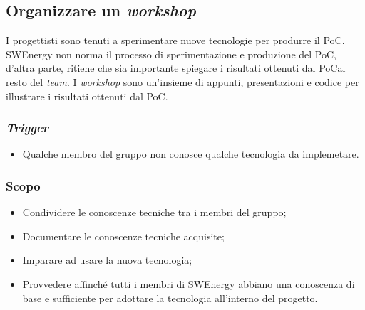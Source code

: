 \subsection{Organizzare un \textit{workshop}}
\label{organizzare-workshop}

I progettisti sono tenuti a sperimentare nuove tecnologie per produrre il PoC\g.
SWEnergy non norma il processo di sperimentazione e produzione del PoC\g, d'altra parte, ritiene che sia importante spiegare i risultati ottenuti dal PoC\g al resto del \textit{team}. I \textit{workshop} sono un'insieme di appunti, presentazioni e codice per illustrare i risultati ottenuti dal PoC\g.

\subsubsection{\textit{Trigger}}
\begin{itemize}
	\item Qualche membro del gruppo non conosce qualche tecnologia da
	      implemetare.
\end{itemize}

\subsubsection{Scopo}
\begin{itemize}
	\item Condividere le conoscenze tecniche tra i membri del gruppo;

	\item Documentare le conoscenze tecniche acquisite;

	\item Imparare ad usare la nuova tecnologia;

	\item Provvedere affinché tutti i membri di SWEnergy abbiano una conoscenza
	      di base e sufficiente per adottare la tecnologia all'interno del
	      progetto.
\end{itemize}

